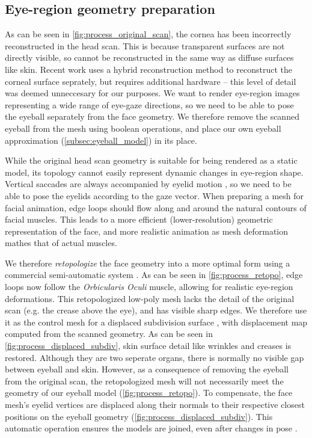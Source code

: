 \subsection{Eye-region geometry preparation}

As can be seen in \autoref{fig:process_original_scan}, the cornea has been incorrectly reconstructed in the head scan. This is because transparent surfaces are not directly visible, so cannot be reconstructed in the same way as diffuse surfaces like skin. Recent work uses a hybrid reconstruction method to reconstruct the corneal surface seprately, but requires additional hardware \cite{berard2014highquality} -- this level of detail was deemed unneccesary for our purposes. We want to render eye-region images representing a wide range of eye-gaze directions, so we need to be able to pose the eyeball separately from the face geometry. We therefore remove the scanned eyeball from the mesh using boolean operations, and place our own eyeball approximation (\autoref{subsec:eyeball_model}) in its place.

While the original head scan geometry is suitable for being rendered as a static model, its topology cannot easily represent dynamic changes in eye-region shape. Vertical saccades are always accompanied by eyelid motion \cite{liversedge2011oxford}, so we need to be able to pose the eyelids according to the gaze vector. When preparing a mesh for facial animation, edge loops should flow along and around the natural contours of facial muscles. This leads to a more efficient (lower-resolution) geometric representation of the face, and more realistic animation as mesh deformation mathes that of actual muscles.


We therefore \emph{retopologize} the face geometry into a more optimal form using a commercial semi-automatic system \cite{ZRemesher}. As can be seen in \autoref{fig:process_retopo}, edge loops now follow the \emph{Orbicularis Oculi} muscle, allowing for realistic eye-region deformations. This retopologized low-poly mesh lacks the detail of the original scan (e.g. the crease above the eye), and has visible sharp edges. We therefore use it as the control mesh for a displaced subdivision surface \cite{lee2000displaced}, with displacement map computed from the scanned geometry. As can be seen in \autoref{fig:process_displaced_subdiv}, skin surface detail like wrinkles and creases is  restored. Although they are two seperate organs, there is normally no visible gap between eyeball and skin. However, as a consequence of removing the eyeball from the original scan, the retopologized mesh will not necessarily meet the geometry of our eyeball model (\autoref{fig:process_retopo}). To compensate, the face mesh's eyelid vertices are displaced along their normals to their respective closest positions on the eyeball geometry (\autoref{fig:process_displaced_subdiv}). This automatic operation ensures the models are joined, even after changes in pose \cite{Shrinkwrap}.

